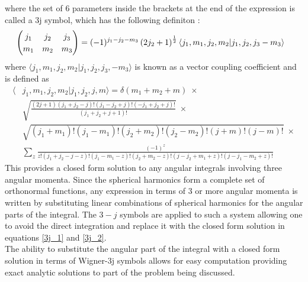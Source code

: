         \noindent where the set of $6$ parameters inside the brackets at the end of the expression is called a $3$j symbol, which has the following definiton \cite{edmonds_book}:
        \begin{align} \label{3j_1}
            & \renewcommand{\arraystretch}{1.2}\begin{pmatrix}
                j_1 & j_2 & j_3\\
                m_1 & m_2 & m_3
            \end{pmatrix} = (-1)^{j_1 - j_2 - m_3} \left( 2j_2 + 1\right)^{\frac{1}{2}} \langle j_1, m_1, j_2, m_2 \vert j_1, j_2, j_3 - m_3 \rangle
        \end{align}
        \noindent where $\langle j_1, m_1, j_2, m_2 \vert j_1, j_2, j_3, - m_3 \rangle$ is known as a vector coupling coefficient and is defined as \cite{edmonds_book}
        \small
        \begin{align}
            \langle &j_1, m_1, j_2, m_2 \vert j_1, j_2, j, m \rangle = \delta(m_1 + m_2 + m) \;\times \label{3j_2}\\
            &\sqrt{\frac{(2j+1)(j_1 + j_2 - j)!(j_1 - j_2 + j)!(-j_1 + j_2 + j)!}{(j_1 + j_2 + j + 1)!}}\;\times \nonumber\\
            &\sqrt{(j_1 + m_1)!(j_1 - m_1)!(j_2 + m_2)!(j_2 - m_2)!(j+m)!(j-m)!} \; \times \nonumber\\
            & \sum_z \frac{(-1)^z}{z!(j_1 + j_2 - j - z)!(j_1 - m_1 - z)!(j_2 + m_2 - z)!(j-j_2+m_1+z)!(j-j_1-m_2 + z)!} \nonumber
        \end{align}
        \normalsize
        \noindent This provides a closed form solution to any angular integrals involving three angular momenta. Since the spherical harmonics form a complete set of orthonormal functions, any expression in terms of 3 or more angular momenta is written by substituting linear combinations of spherical harmonics for the angular parts of the integral. The $3-j$ symbols are applied to such a system allowing one to avoid the direct integration and replace it with the closed form solution in equations \eqref{3j_1} and \eqref{3j_2}. \\
    
        The ability to substitute the angular part of the integral with a closed form solution in terms of Wigner-3j symbols allows for easy computation providing exact analytic solutions to part of the problem being discussed.


